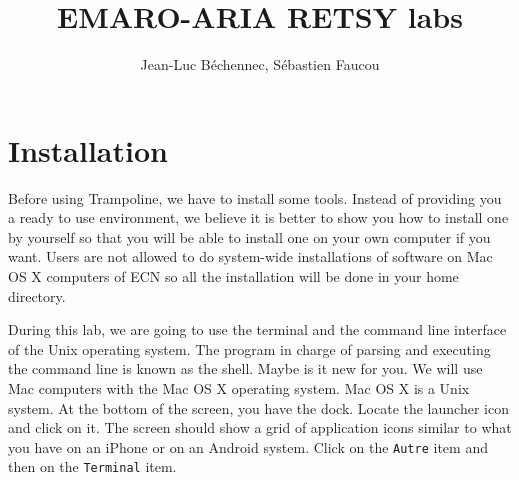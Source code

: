 \documentclass[11pt]{report}
\title{EMARO-ARIA RETSY labs}
\author{Jean-Luc B\'echennec, S\'ebastien Faucou}
\begin{document}
\maketitle

\chapter{Installation}

Before using Trampoline, we have to install some tools. Instead
of providing you a ready to use environment, we believe it is
better to show you how to install one by yourself so that you
will be able to install one on your own computer if you want.
Users are not allowed to do system-wide installations of software
on Mac OS X computers of ECN so all the installation will be done
in your home directory.

During this lab, we are going to use the terminal and the command line interface of the Unix operating system. The program in charge of parsing and executing the command line is known as the shell. Maybe is it new for you. We will use Mac computers with the Mac OS X operating system. Mac OS X is a Unix system. At the bottom of the screen, you have the dock. Locate the launcher icon and click on it. The screen should show a grid of application icons similar to what you have on an iPhone or on an Android system. Click on the {\tt Autre} item and then on the {\tt Terminal} item.
\end{document}
